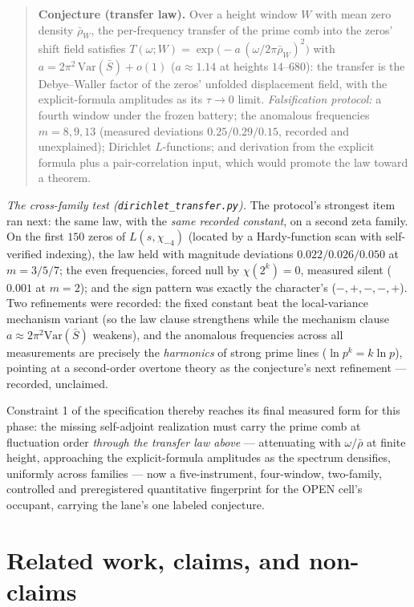 \documentclass[11pt]{article}
\theoremstyle{remark}
\begin{document}
\begin{quote}
\textbf{Conjecture (transfer law).} Over a height window $W$ with mean zero density $\bar\rho_W$,
the per-frequency transfer of the prime comb into the zeros' shift field satisfies
$T(\omega; W) = \exp\!\bigl(-a\,(\omega/2\pi\bar\rho_W)^2\bigr)$ with
$a = 2\pi^2\,\mathrm{Var}(\bar S) + o(1)$ ($a \approx 1.14$ at heights $14$--$680$): the transfer
is the Debye--Waller factor of the zeros' unfolded displacement field, with the explicit-formula
amplitudes as its $\tau \to 0$ limit. \emph{Falsification protocol:} a fourth window under the
frozen battery; the anomalous frequencies $m = 8, 9, 13$ (measured deviations $0.25/0.29/0.15$,
recorded and unexplained); Dirichlet $L$-functions; and derivation from the explicit formula plus
a pair-correlation input, which would promote the law toward a theorem.
\end{quote}

\emph{The cross-family test (\texttt{dirichlet\_transfer.py}).} The protocol's strongest item ran
next: the same law, with the \emph{same recorded constant}, on a second zeta family. On the first
$150$ zeros of $L(s, \chi_{-4})$ (located by a Hardy-function scan with self-verified indexing),
the law held with magnitude deviations $0.022/0.026/0.050$ at $m = 3/5/7$; the even frequencies,
forced null by $\chi(2^k) = 0$, measured silent ($0.001$ at $m = 2$); and the sign pattern was
exactly the character's ($-,+,-,-,+$). Two refinements were recorded: the fixed constant beat the
local-variance mechanism variant (so the law clause strengthens while the mechanism clause
$a \approx 2\pi^2\mathrm{Var}(\bar S)$ weakens), and the anomalous frequencies across all
measurements are precisely the \emph{harmonics} of strong prime lines ($\ln p^k = k \ln p$),
pointing at a second-order overtone theory as the conjecture's next refinement --- recorded,
unclaimed.

Constraint 1 of the specification thereby reaches its final measured form for this phase: the
missing self-adjoint realization must carry the prime comb at fluctuation order \emph{through the
transfer law above} --- attenuating with $\omega/\bar\rho$ at finite height, approaching the
explicit-formula amplitudes as the spectrum densifies, uniformly across families --- now a
five-instrument, four-window, two-family, controlled and preregistered quantitative fingerprint
for the OPEN cell's occupant, carrying the lane's one labeled conjecture.

\section{Related work, claims, and non-claims}
\end{document}
